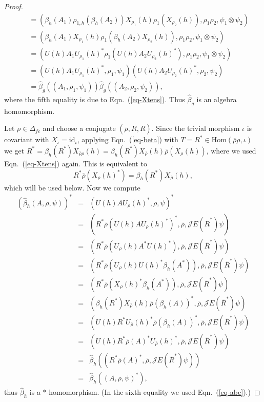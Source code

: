 \documentclass[11pt]{article}
\theoremstyle{definition}
\theoremstyle{definition}
\theoremstyle{remark}
\def\2#1{{\mathcal #1}}
\def\ol#1{{\overline #1}}
\newcommand{\Hom}{\mathrm{Hom}}
\def\id{\mathrm{id}}
\begin{document}
\begin{proof}
\begin{eqnarray*}
  &&= (\beta_h(A_1)\rho_{1,h}(\beta_h(A_2))X_{\rho_1}(h)\rho_1(X_{\rho_2}(h)),\rho_1\rho_2,\psi_1\otimes\psi_2) \\
  &&= (\beta_h(A_1)X_{\rho_1}(h)\rho_1(\beta_h(A_2)X_{\rho_2}(h)),\rho_1\rho_2,\psi_1\otimes\psi_2) \\
  &&= (U(h)A_1U_{\rho_1}(h)^*\rho_1(U(h)A_2U_{\rho_2}(h)^*),\rho_1\rho_2,\psi_1\otimes\psi_2) \\
  &&= (U(h)A_1U_{\rho_1}(h)^*,\rho_1,\psi_1)(U(h)A_2U_{\rho_2}(h)^*,\rho_2,\psi_2) \\
  &&= \widehat{\beta}_g((A_1,\rho_1,\psi_1))\widehat{\beta}_g((A_2,\rho_2,\psi_2)),
\end{eqnarray*}
where the fifth equality is due to Eqn.\ (\ref{eq-Xtens}). Thus $\widehat{\beta}_g$ is an algebra
homomorphism.   

Let $\rho\in\Delta_{fc}$ and choose a conjugate $(\ol{\rho},R,\ol{R})$. Since the trivial morphism
$\iota$ is covariant with $X_\iota=\id_\iota$, applying Eqn.\ (\ref{eq-beta}) with
$T=R^*\in\Hom(\ol{\rho}\rho,\iota)$ we get
$R^*=\beta_h(R^*)X_{\ol{\rho}\rho}(h)=\beta_h(R^*)X_{\ol{\rho}}(h)\ol{\rho}(X_\rho(h))$, 
where we used Eqn.\ (\ref{eq-Xtens}) again. This is equivalent to
\begin{equation}\label{eq-abc} R^*\overline{\rho}(X_\rho(h)^*)=\beta_h(R^*)X_{\overline{\rho}}(h),
\end{equation}
which will be used below. Now
we compute
\begin{eqnarray*}
 (\widehat{\beta}_h(A,\rho,\psi))^* &=&  (U(h)AU_\rho(h)^*,\rho,\psi)^* \\
   &=& (R^*\overline{\rho}(U(h)AU_\rho(h)^*)^*,\ol\rho,\2JE(\overline{R}^*)\psi) \\
   &=& (R^*\overline{\rho}(U_\rho(h)A^*U(h)^*),\ol\rho,\2JE(\overline{R}^*)\psi) \\
   &=& (R^*\overline{\rho}(U_\rho(h)U(h)^*\beta_h(A^*)),\ol\rho,\2JE(\overline{R}^*)\psi) \\
   &=& (R^*\overline{\rho}(X_\rho(h)^*\beta_h(A^*)),\ol\rho,\2JE(\overline{R}^*)\psi) \\
   &=& (\beta_h(R^*)X_{\overline{\rho}}(h)\overline{\rho}(\beta_h(A))^*,\ol\rho,\2JE(\overline{R}^*)\psi) \\
   &=& (U(h)R^*U_{\overline{\rho}}(h)^*\overline{\rho}(\beta_h(A))^*,\ol\rho,\2JE(\overline{R}^*)\psi) \\
   &=& (U(h)R^*\overline{\rho}(A)^*U_{\overline{\rho}}(h)^*,\ol\rho,\2JE(\overline{R}^*)\psi) \\
   &=& \widehat{\beta}_h((R^*\overline{\rho}(A)^*,\ol\rho,\2JE(\overline{R}^*)\psi)) \\
   &=& \widehat{\beta}_h((A,\rho,\psi)^*),
\end{eqnarray*}
thus $\widehat{\beta}_h$ is a $*$-homomorphism. (In the sixth equality we used Eqn.\ (\ref{eq-abc}).)


\end{proof}
\end{document}
